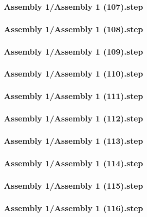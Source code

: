 \documentclass[a4paper,12pt]{article}
\begin{document}
\subsubsection{Assembly 1/Assembly 1 (107).step}

\subsubsection{Assembly 1/Assembly 1 (108).step}

\subsubsection{Assembly 1/Assembly 1 (109).step}

\subsubsection{Assembly 1/Assembly 1 (110).step}

\subsubsection{Assembly 1/Assembly 1 (111).step}

\subsubsection{Assembly 1/Assembly 1 (112).step}

\subsubsection{Assembly 1/Assembly 1 (113).step}

\subsubsection{Assembly 1/Assembly 1 (114).step}

\subsubsection{Assembly 1/Assembly 1 (115).step}

\subsubsection{Assembly 1/Assembly 1 (116).step}

\end{document}
